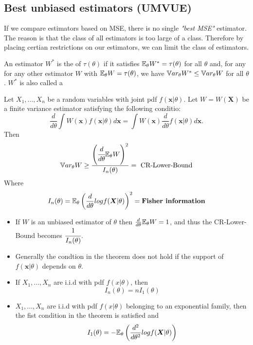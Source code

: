 \subsection{Best unbiased estimators (UMVUE)}
If we compare estimators based on MSE, there is no single \textit{"best MSE"} estimator. The reason is that the class of all estimators is too large of a class. Therefore by placing certian restrictions on our estimators, we can limit the class of estimators.  
\begin{definition}
    An estimator $W^*$ is the  of $\tau(\theta)$ if it satisfies $\mathbb E_{\theta}W^* = \tau(\theta)$ for all $\theta$ and, for any for any other estimator $W$ with $\mathbb E_{\theta}W = \tau(\theta)$, we have $\mathbb V ar_{\theta}W^* \leq \mathbb V ar_{\theta} W$ for all $\theta$. $W^*$ is also called a 
\end{definition}
\begin{theorem}
    Let $X_1,...,X_n$ be a random variables with joint pdf $f(\boldsymbol{x}|\theta)$. Let $W = W(\boldsymbol{X})$ be a finite variance estimator satisfying the following conditio:
    $$
    \frac{d}{d\theta} \int W(\boldsymbol{x})f(\boldsymbol{x}|\theta)d\boldsymbol{x} = 
    \int W(\boldsymbol{x}) \frac{d}{d \theta}f(\boldsymbol{x}|\theta)d \boldsymbol{x}.
    $$
    Then 
    $$
    \mathbb V ar_{\theta}W \geq \frac{\left( \cfrac{d}{d\theta} \mathbb E_\theta W \right)^2}{I_n(\theta)}
    = \text{ CR-Lower-Bound}
    $$
    Where
    $$
    I_n(\theta) = \mathbb E_{\theta}\left (
    \frac{d}{d \theta} log f(\boldsymbol{X}|\theta)
    \right)^2 = \textbf{Fisher information}
    $$
\end{theorem}
\begin{itemize}
    \item If $W$ is an unbiased estimator of $\theta$ then $\frac{d}{d \theta} \mathbb E_{\theta}W =1$, and thus the CR-Lower-Bound becomes $\cfrac{1}{I_n(\theta)}$.
    \item Generally the condtion in the theorem does not hold if the support of $f(\boldsymbol{x}|\theta)$ depends on $\theta$.
    \item If $X_1,...,X_n$ are i.i.d with pdf $f(x|\theta)$, then
    $$
    I_n(\theta) = nI_1(\theta)
    $$
    \item $X_1,...,X_n$ are i.i.d with pdf $f(x|\theta)$ belonging to an exponential family, then the fist condition in the theorem is satisfied and
    $$
    I_1(\theta) = - \mathbb E_{\theta}\left(
    \frac{d^2}{d\theta^2}logf(\boldsymbol{X}|\theta)
    \right )
    $$
\end{itemize}